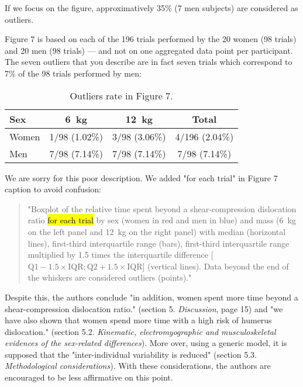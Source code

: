 \documentclass[preprint,review,12pt]{elsarticle}
\begin{document}
    \begin{formal}
        If we focus on the figure, approximatively 35\% (7 men subjects) are considered as outliers.
    \end{formal}

    Figure 7 is based on each of the 196 trials performed by the 20 women (98 trials) and 20 men (98 trials) --- and not on one aggregated data point per participant.
    The seven outliers that you describe are in fact seven trials which correspond to 7\% of the 98 trials performed by men:

    \begin{table}[H]
        \centering
        \caption{Outliers rate in Figure 7.}
        \begin{tabular}{lccc}
            \hline
            Sex & 6~kg & 12~kg & Total         \\ \hline
            Women & 1/98 (1.02\%) & 3/98 (3.06\%) & 4/196 (2.04\%) \\
            Men & 7/98 (7.14\%) & 7/98 (7.14\%) & 7/98 (7.14\%) \\ \hline
        \end{tabular}
    \end{table}

    We are sorry for this poor description.
    We added "for each trial" in Figure 7 caption to avoid confusion:

    \begin{quote}
        "Boxplot of the relative time spent beyond a shear-compression dislocation ratio \hl{for each trial} by sex (women in red and men in blue) and mass (6~kg on the left panel and 12~kg on the right panel) with median (horizontal lines), first-third interquartile range (bars), first-third interquartile range multiplied by 1.5 times the interquartile difference [$\textrm{Q1} - 1.5 \times \textrm{IQR}; \textrm{Q2} + 1.5 \times \textrm{IQR}$] (vertical lines).
        Data beyond the end of the whiskers are considered outliers (points)."
    \end{quote}

    \begin{formal}
        Despite this, the authors conclude "in addition, women spent more time beyond a shear-compression dislocation ratio." (section 5. \textit{Discussion}, page 15) and "we have also shown that women spend more time with a high risk of humerus dislocation." (section 5.2. \textit{Kinematic, electromyographic and musculoskeletal evidences of the sex-related differences}).
        More over, using a generic model, it is supposed that the "inter-individual variability is reduced" (section 5.3. \textit{Methodological considerations}).
        With these considerations, the authors are encouraged to be less affirmative on this point.
    \end{formal}
\end{document}
